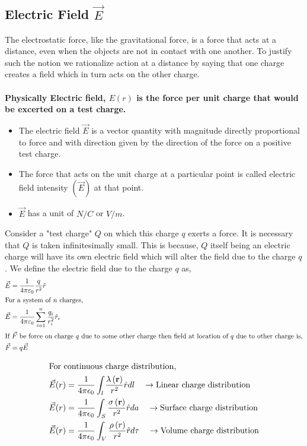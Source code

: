 \subsection{Electric Field \textbf{$ \vec{E}$}}
The electrostatic force, like the gravitational force, is a force that acts at a distance, even
when the objects are not in contact with one another. To justify such the notion we rationalize action at a distance by saying that one charge creates a field which in turn acts on the other charge.\\\\
\textbf{Physically Electric field, $E(r)$ is the force per unit charge that would be excerted on a test charge.}
\begin{itemize}
	\item The electric field $ \vec{E}$ is a vector quantity with magnitude directly proportional to force and with direction given by the direction of the force on a positive test charge.
	\item The force that acts on the unit charge at a particular point is called electric field intensity $(\vec{E})$ at that point.
	\item $\vec{E}$ has a unit of $N/C$ or $V/m$.
\end{itemize}
 Consider a "test charge" $Q$ on which this charge
$ q $ exerts a force. It is necessary that $Q$ is taken infinitesimally small. This is because, $Q$ itself being an electric charge will have its own electric field which will alter the field due to the charge $ q $.  We define the electric field due to the charge $ q $ as,
\begin{align}
\notag \vec{E}&=\frac{1}{4 \pi \varepsilon_{0}}  \frac{q}{r^{2}} \hat{r}\\
\intertext{For a system of $n$ charges,}
\vec{E}&=\frac{1}{4 \pi \varepsilon_{0}} \sum_{i=1}^{n} \frac{q_{i}}{r_{i}^{2}} \hat{r}_{i}\\
\intertext{If $\vec{F}$ be force on charge $q$ due to some other charge then field at location of $q$ due to other charge is,}
\vec{F}&=q\vec{E}
\end{align}
\begin{minipage}{0.65\textwidth}
	\begin{align*}
\intertext{For continuous charge distribution,}
\vec{E}({r})&=\frac{1}{4 \pi \epsilon_{0}} \int_{{l}} \frac{\lambda\left(\mathbf{r}\right)}{r^{2}} \hat{{r}} d l\quad\rightarrow \text{Linear charge distribution}\\
\vec{E}({r})&=\frac{1}{4 \pi \epsilon_{0}} \int_{{S}} \frac{\sigma\left(\mathbf{r}\right)}{r^{2}} \hat{{r}} d a\quad\rightarrow \text{Surface charge distribution}\\	
\vec{E}({r})&=\frac{1}{4 \pi \epsilon_{0}} \int_{{V}} \frac{\rho\left({r}\right)}{r^{2}} \hat{r} d \tau\quad \rightarrow \text{Volume charge distribution}
	\end{align*}
\end{minipage}
